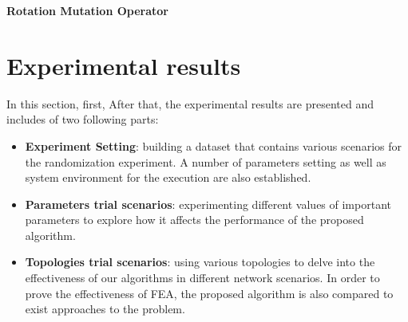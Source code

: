 \documentclass[final]{elsarticle}
\begin{document}
\begin{algorithm}[h]
	\SetAlgoLined
	\caption{\textbf{Rotation Mutation Operator}} 
	\label{alg.4}
\end{algorithm} 


\section{Experimental results}
In this section, first,  After that, the experimental results are presented and includes of two following parts: 
\begin{itemize}
	\item \textbf{Experiment Setting}: building a dataset that contains various scenarios for the randomization experiment. A number of parameters setting as well as system environment for the execution are also established.
	\item \textbf{Parameters trial scenarios}: experimenting different values of important parameters to explore how it affects the performance of the proposed algorithm.
	\item \textbf{Topologies trial scenarios}: using various topologies to delve into the effectiveness of our algorithms in different network scenarios. In order to prove the effectiveness of FEA, the proposed algorithm is also compared to exist approaches to the problem.
\end{itemize} 
\end{document}
